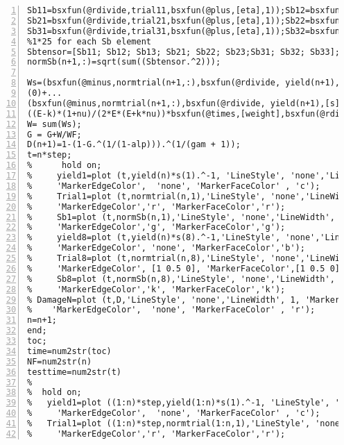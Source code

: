 \begin{lstlisting}[numbers=left, numberstyle=\tiny, keywordstyle=\color{blue!100}, commentstyle=\color{red!30!green!100!blue!100}, frame=shadowbox, rulesepcolor=\color{red!20!green!20!blue!20}]
Sb11=bsxfun(@rdivide,trial11,bsxfun(@plus,[eta],1));Sb12=bsxfun(@rdivide,trial12,bsxfun(@plus,[eta],1));Sb13=bsxfun(@rdivide,trial13,bsxfun(@plus,[eta],1));
Sb21=bsxfun(@rdivide,trial21,bsxfun(@plus,[eta],1));Sb22=bsxfun(@rdivide,trial22,bsxfun(@plus,[eta],1));Sb23=bsxfun(@rdivide,trial23,bsxfun(@plus,[eta],1));
Sb31=bsxfun(@rdivide,trial31,bsxfun(@plus,[eta],1));Sb32=bsxfun(@rdivide,trial32,bsxfun(@plus,[eta],1));Sb33=bsxfun(@rdivide,trial33,bsxfun(@plus,[eta],1));
%1*25 for each Sb element
Sbtensor=[Sb11; Sb12; Sb13; Sb21; Sb22; Sb23;Sb31; Sb32; Sb33];
normSb(n+1,:)=sqrt(sum((Sbtensor.^2)));

Ws=(bsxfun(@minus,normtrial(n+1,:),bsxfun(@rdivide, yield(n+1),[s]))<=0).*...
(0)+...
(bsxfun(@minus,normtrial(n+1,:),bsxfun(@rdivide, yield(n+1),[s]))>0).*...
((E-k)*(1+nu)/(2*E*(E+k*nu))*bsxfun(@times,[weight],bsxfun(@rdivide,bsxfun(@times,bsxfun(@minus,normtrial(n+1,:),bsxfun(@rdivide, yield(n+1),[s])),yield(n+1)),[s])));
W= sum(Ws); 
G = G+W/WF;
D(n+1)=1-(1-G.^(1/(1-alp))).^(1/(gam + 1));
t=n*step;
%      hold on;
%     yield1=plot (t,yield(n)*s(1).^-1, 'LineStyle', 'none','LineWidth', 1, 'Marker', 'o', 'MarkerSize', 6, ...
%     'MarkerEdgeColor',  'none', 'MarkerFaceColor' , 'c');
%     Trial1=plot (t,normtrial(n,1),'LineStyle', 'none','LineWidth', 1,'Marker', '^', 'MarkerSize', 6, ...
%     'MarkerEdgeColor','r', 'MarkerFaceColor','r');
%     Sb1=plot (t,normSb(n,1),'LineStyle', 'none','LineWidth', 1,'Marker', 'v', 'MarkerSize', 6, ...
%     'MarkerEdgeColor','g', 'MarkerFaceColor','g');
%     yield8=plot (t,yield(n)*s(8).^-1,'LineStyle', 'none','LineWidth', 1,'Marker', 'o', 'MarkerSize', 6, ...
%     'MarkerEdgeColor', 'none', 'MarkerFaceColor','b');
%     Trial8=plot (t,normtrial(n,8),'LineStyle', 'none','LineWidth', 1,'Marker', '^', 'MarkerSize', 6, ...
%     'MarkerEdgeColor', [1 0.5 0], 'MarkerFaceColor',[1 0.5 0]);
%     Sb8=plot (t,normSb(n,8),'LineStyle', 'none','LineWidth', 1,'Marker', 'v', 'MarkerSize', 6, ...
%     'MarkerEdgeColor','k', 'MarkerFaceColor','k');
% DamageN=plot (t,D,'LineStyle', 'none','LineWidth', 1, 'Marker', 'o', 'MarkerSize', 6, ...
%    'MarkerEdgeColor',  'none', 'MarkerFaceColor' , 'r');
n=n+1;
end;
toc;
time=num2str(toc)
NF=num2str(n) 
testtime=num2str(t) 
% 
%  hold on;
%   yield1=plot ((1:n)*step,yield(1:n)*s(1).^-1, 'LineStyle', 'none','LineWidth', 1, 'Marker', 'o', 'MarkerSize', 6, ...
%     'MarkerEdgeColor',  'none', 'MarkerFaceColor' , 'c');
%   Trial1=plot ((1:n)*step,normtrial(1:n,1),'LineStyle', 'none','LineWidth', 1,'Marker', '^', 'MarkerSize', 6, ...
%     'MarkerEdgeColor','r', 'MarkerFaceColor','r');

\end{lstlisting}
